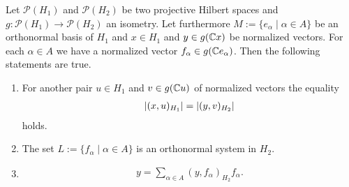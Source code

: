 \begin{lemma}
	Let $\mathcal{P}(H_1)$ and $\mathcal{P}(H_2)$ be two projective Hilbert spaces and $g: \mathcal{P}(H_1) \to \mathcal{P}(H_2)$ an isometry. Let furthermore $M := \{e_\alpha \mid \alpha \in A\}$ be an orthonormal basis of $H_1$ and $x \in H_1$ and $y \in g(\mathbb{C} x)$ be normalized vectors. For each $\alpha \in A$ we have a normalized vector $f_\alpha \in g(\mathbb{C} e_\alpha)$.  Then the  following statements are true.
	
	\begin{enumerate}
		\item For another pair $u \in H_1$ and $v \in g(\mathbb{C} u)$ of normalized vectors the equality
		\begin{align} 
			{\left | (x, u)_{H_1} \right |} = {\left | (y, v)_{H_2} \right |} \label{eq:vector_isometry}
		\end{align}
		holds.		
		
		\item The set $L:=\{f_\alpha \mid \alpha \in A\}$ is an orthonormal system in $H_2$. \label{bullet:ran_ons}
		
		\item 
		\begin{align}
		y = \sum_{\alpha \in A} (y, f_\alpha)_{H_2} f_\alpha. \label{eq:ran_fourier}
		\end{align}
		
	\end{enumerate} 
\end{lemma}

